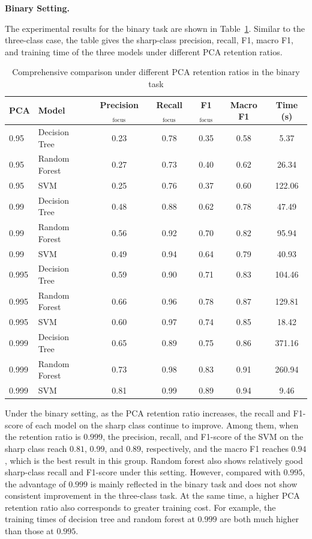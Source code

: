 \par\medskip \noindent\textbf{Binary Setting.} \par The experimental results
for the binary task are shown in Table~\ref{tab:pca-binary-pca}. Similar to the
three-class case, the table gives the sharp-class precision, recall, F1,
macro F1, and training time of the three models under different PCA retention
ratios.

\begin{table}[htbp]
    \centering
    \caption{Comprehensive comparison under different PCA retention ratios in the binary task}
    \label{tab:pca-binary-pca}
    \begin{tabular}{llccccc}
        \toprule
        PCA & Model & Precision$_{\mathrm{focus}}$ & Recall$_{\mathrm{focus}}$ &
        F1$_{\mathrm{focus}}$ & Macro F1 & Time (s) \\
        \midrule
        0.95  & Decision Tree & 0.23 & 0.78 & 0.35 & 0.58 & 5.37   \\
        0.95  & Random Forest & 0.27 & 0.73 & 0.40 & 0.62 & 26.34  \\
        0.95  & SVM           & 0.25 & 0.76 & 0.37 & 0.60 & 122.06 \\
        0.99  & Decision Tree & 0.48 & 0.88 & 0.62 & 0.78 & 47.49  \\
        0.99  & Random Forest & 0.56 & 0.92 & 0.70 & 0.82 & 95.94  \\
        0.99  & SVM           & 0.49 & 0.94 & 0.64 & 0.79 & 40.93  \\
        0.995 & Decision Tree & 0.59 & 0.90 & 0.71 & 0.83 & 104.46 \\
        0.995 & Random Forest & 0.66 & 0.96 & 0.78 & 0.87 & 129.81 \\
        0.995 & SVM           & 0.60 & 0.97 & 0.74 & 0.85 & 18.42  \\
        0.999 & Decision Tree & 0.65 & 0.89 & 0.75 & 0.86 & 371.16 \\
        0.999 & Random Forest & 0.73 & 0.98 & 0.83 & 0.91 & 260.94 \\
        0.999 & SVM           & 0.81 & 0.99 & 0.89 & 0.94 & 9.46   \\
        \bottomrule
    \end{tabular}
\end{table}

\par Under the binary setting, as the PCA retention ratio increases, the recall
and F1-score of each model on the sharp class continue to improve. Among them,
when the retention ratio is $0.999$, the precision, recall, and F1-score of
the SVM on the sharp class reach $0.81$, $0.99$, and $0.89$, respectively, and
the macro F1 reaches $0.94$, which is the best result in this group. Random
forest also shows relatively good sharp-class recall and F1-score under this
setting. However, compared with $0.995$, the advantage of $0.999$ is mainly
reflected in the binary task and does not show consistent improvement in the
three-class task. At the same time, a higher PCA retention ratio also
corresponds to greater training cost. For example, the training times of
decision tree and random forest at $0.999$ are both much higher than those at
$0.995$.

